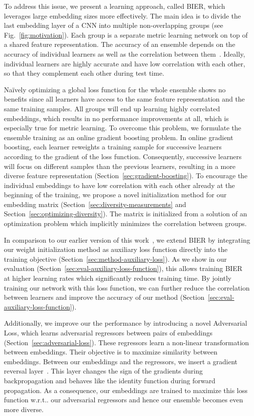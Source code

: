 \documentclass[10pt,journal,compsoc]{IEEEtran}
\makeatletter
\DeclareRobustCommand\onedot{\futurelet\@let@token\@onedot}
\def\@onedot{\ifx\@let@token.\else.\null\fi\xspace}
\def\wrt{w.r.t\onedot} \def\dof{d.o.f\onedot}
\makeatother
\begin{document}
To address this issue, 
we present a learning approach, called \ac{BIER}, which 
leverages large embedding sizes more effectively. The main idea is to divide the last embedding
layer of a \ac{CNN} into multiple non-overlapping groups (see Fig.~\ref{fig:motivation}). Each group
is a separate metric learning network on top of a shared feature representation. 
The accuracy of an ensemble depends on the accuracy of individual learners
as well as the correlation between them~\cite{breiman2001random}. Ideally, individual learners are highly
accurate and have low correlation with each other, so that they complement each other during 
test time.

Na\"ively optimizing a global loss function for the whole ensemble shows no benefits since all learners have access to the same feature representation and the same training samples. All
groups will end up learning highly correlated embeddings, which results in no performance improvements at all, which is especially true for metric learning.
To overcome this problem, we formulate the ensemble training as an online
gradient boosting problem. In online gradient boosting, each learner reweights a training sample for
successive learners according to the gradient of the loss function. Consequently,
successive learners will focus on different samples than the previous learners,
resulting in a more diverse feature representation (Section~\ref{sec:gradient-boosting}). 
To encourage the individual embeddings to have low correlation with each other already at the beginning of the training, 
we propose a novel initialization method for our embedding matrix (Section~\ref{sec:diversity-measurements} and Section~\ref{sec:optimizing-diversity}). 
The matrix is initialized from a solution of an optimization problem which implicitly minimizes
the correlation between groups. 

In comparison to our earlier version of this work~\cite{opitz2017bier}, we
extend \ac{BIER} by integrating our weight initialization method as auxiliary loss function directly into
the training objective (Section~\ref{sec:method-auxiliary-loss}). As we show in our evaluation
(Section~\ref{sec:eval-auxiliary-loss-function}), this allows training \ac{BIER} at higher learning rates
which significantly reduces training time. By jointly training our network with this loss function, we can further reduce the correlation between 
learners and improve
the accuracy of our method (Section~\ref{sec:eval-auxiliary-loss-function}).

Additionally, we improve our the performance by introducing a novel Adversarial Loss, which learns adversarial regressors
between pairs of embeddings (Section~\ref{sec:adversarial-loss}). These 
regressors learn a non-linear transformation between embeddings. Their objective is to maximize similarity 
between embeddings.
Between
our embeddings and the regressors, we insert a gradient reversal
layer~\cite{ganin2016domain}. This layer changes the sign of the gradients during backpropagation and behaves like 
the identity function during forward propagation.
As a consequence, our embeddings are trained to maximize this loss function \wrt our adversarial regressors and hence our ensemble becomes even more diverse.
\end{document}
